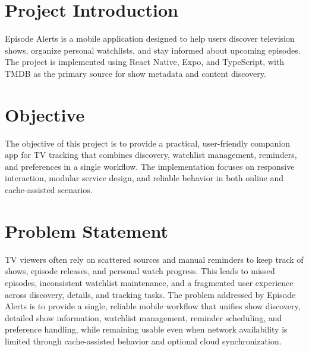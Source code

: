 \section{Project Introduction}
Episode Alerts is a mobile application designed to help users discover television shows, organize personal watchlists, and stay informed about upcoming episodes. The project is implemented using React Native, Expo, and TypeScript, with TMDB as the primary source for show metadata and content discovery.

\section{Objective}
The objective of this project is to provide a practical, user-friendly companion app for TV tracking that combines discovery, watchlist management, reminders, and preferences in a single workflow. The implementation focuses on responsive interaction, modular service design, and reliable behavior in both online and cache-assisted scenarios.

\section{Problem Statement}
TV viewers often rely on scattered sources and manual reminders to keep track of shows, episode releases, and personal watch progress. This leads to missed episodes, inconsistent watchlist maintenance, and a fragmented user experience across discovery, details, and tracking tasks. The problem addressed by Episode Alerts is to provide a single, reliable mobile workflow that unifies show discovery, detailed show information, watchlist management, reminder scheduling, and preference handling, while remaining usable even when network availability is limited through cache-assisted behavior and optional cloud synchronization.
